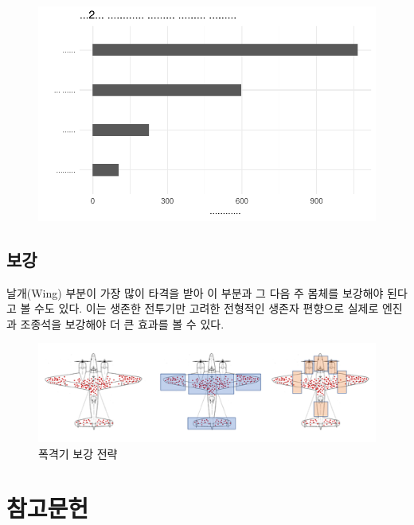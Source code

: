 \documentclass[
  letterpaper,
  chapter,a4paper,showtrims,openright,hidelinks]{oblivoir}
\begin{document}
\begin{figure}[H]

{\centering \includegraphics{cs_bomber_files/figure-pdf/unnamed-chunk-4-1.pdf}

}

\end{figure}

\hypertarget{uxbcf4uxac15}{%
\section{보강}\label{uxbcf4uxac15}}

날개(Wing) 부분이 가장 많이 타격을 받아 이 부분과 그 다음 주 몸체를
보강해야 된다고 볼 수도 있다. 이는 생존한 전투기만 고려한 전형적인
생존자 편향으로 실제로 엔진과 조종석을 보강해야 더 큰 효과를 볼 수 있다.

\begin{figure}

{\centering \includegraphics{images/survivorship_bias_plane.png}

}

\caption{폭격기 보강 전략}

\end{figure}


\hypertarget{uxcc38uxace0uxbb38uxd5cc}{%
\chapter*{참고문헌}\label{uxcc38uxace0uxbb38uxd5cc}}


\printbibliography[heading=none]
\end{document}
